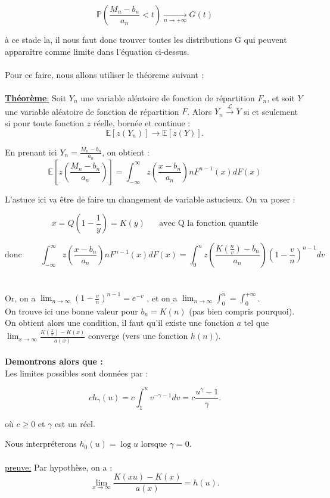 \documentclass{article}
\begin{document}
\[
\mathbb{P} \left( \frac{M_n - b_n}{a_n} < t \right) \xrightarrow[n\to +\infty]{} G(t)
\]

à ce stade la, il nous faut donc trouver toutes les distributions G qui peuvent apparaître comme limite dans l’équation ci-dessus.
\\
\\
Pour ce faire, nous allons utiliser le théoreme suivant : 
\\
\\
\underline{\textbf{Théorème}:}
Soit \( Y_n \) une variable aléatoire de fonction de répartition \( F_n \), et soit \( Y \) une variable aléatoire de fonction de répartition \( F \).  
Alors $Y_n \xrightarrow{\mathcal{L} } Y$ si et seulement si pour toute fonction $z$ réelle, bornée et continue :
\[
\mathbb{E}[z(Y_n)] \to \mathbb{E}[z(Y)].
\]

En prenant ici $Y_n = \frac{M_n -b_n}{a_n}$, on obtient :
\[
\mathbb{E}[z(\frac{M_n -b_n}{a_n})] = \int_{-\infty}^{\infty} z(\frac{x-b_n}{a_n}) n F^{n-1} (x)dF(x)
\]

L'astuce ici va être de faire un changement de variable astucieux. On va poser : 

\[
x = Q(1-\frac{1}{y}) = K(y) \; \; \; \; \; \; \text{avec Q la fonction quantile}
\]

\[
\text{donc} \;\;\;\;\;\;\;\; \int_{-\infty}^{\infty} z(\frac{x-b_n}{a_n}) n F^{n-1} (x)dF(x) = \int_{0}^{n} z(\frac{K(\frac{n}{v}) - b_n}{a_n}) ( 1 - \frac{v}{n})^{n-1} dv
\]
\\
\\
Or, on a $\lim_{n \to \infty} ( 1 - \frac{v}{n})^{n-1} = e^{-v}$ , et on a $\lim_{n \to \infty} \int_{0}^{n} = \int_{0}^{+ \infty}$.
\\
On trouve ici une bonne valeur pour $b_n = K(n)$ (pas bien compris pourquoi).
\\
On obtient alors une condition, il faut qu'il existe une fonction $a$ tel que $\lim_{x \to \infty} \frac{K(\frac{x}{v}) - K(x)}{a(x)}$ converge (vers une fonction $h(n)$).
\\
\\
\textbf{Demontrons alors que :}
\\
Les limites possibles sont données par :

\[
ch_\gamma (u) = c \int_1^u v^{-\gamma - 1} dv = c \frac{u^\gamma - 1}{\gamma}.
\]

où \( c \geq 0 \) et \( \gamma \) est un réel.

Nous interpréterons \( h_0 (u) = \log u \) lorsque \( \gamma = 0 \).
\\
\\
\underline{preuve:}
Par hypothèse, on a :
\\
\[
\lim_{x \to \infty} \frac{K(xu) - K(x)}{a(x)} = h (u).
\]
\end{document}
